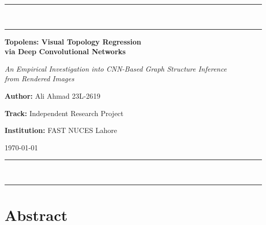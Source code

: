 \documentclass[11pt,letterpaper]{article}
\numberwithin{equation}{section}
\numberwithin{figure}{section}
\numberwithin{table}{section}
\begin{document}
\begin{titlepage}
    \centering
    \vspace*{2cm}

    \noindent\textcolor{accent}{\rule{\linewidth}{2pt}}\\[-4pt]
    \noindent\textcolor{accent}{\rule{\linewidth}{0.4pt}}

    \vspace{1.2cm}

    {\Huge \bfseries \color{reportblue} Topolens: Visual Topology Regression \\ via Deep Convolutional Networks \par}
    \vspace{1cm}
    {\Large \itshape An Empirical Investigation into CNN-Based Graph Structure Inference \\ from Rendered Images \par}

    \vspace{2.5cm}

    {\large \textbf{Author:} Ali Ahmad 23L-2619 \par}
    {\large \textbf{Track:} Independent Research Project \par}

    \vspace{2cm}

    {\large \textbf{Institution:} FAST NUCES Lahore \par}

    \vspace{2.5cm}

    {\large \today \par}

    \vfill
    \noindent\textcolor{accent}{\rule{\linewidth}{0.4pt}}\\[-4pt]
    \noindent\textcolor{accent}{\rule{\linewidth}{2pt}}
\end{titlepage}


\section*{Abstract}
\end{document}
